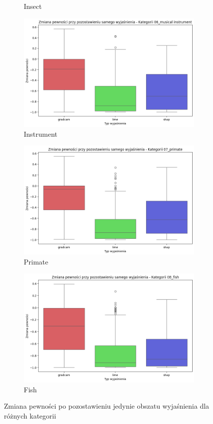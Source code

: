\begin{figure}
\begin{subfigure}[b]{0.3\textwidth}
		\caption{Insect}  \label{rys:base_confidence_exp_insect}
	\end{subfigure}
	\begin{subfigure}[b]{0.3\textwidth}
		\centering\includegraphics[width=.9\textwidth]{img/base_confidence_exp_music}
		\caption{Instrument}  \label{rys:base_confidence_exp_music}
	\end{subfigure}
	\begin{subfigure}[b]{0.3\textwidth}
		\centering\includegraphics[width=.9\textwidth]{img/base_confidence_exp_primate}
		\caption{Primate}  \label{rys:base_confidence_exp_primate}
	\end{subfigure}
	\begin{subfigure}[b]{0.3\textwidth}
		\centering\includegraphics[width=.9\textwidth]{img/base_confidence_exp_fish}
		\caption{Fish}  \label{rys:base_confidence_exp_fish}
	\end{subfigure}
	\caption{Zmiana pewności po pozostawieniu jedynie obszatu wyjaśnienia dla różnych kategorii}
\end{figure}

